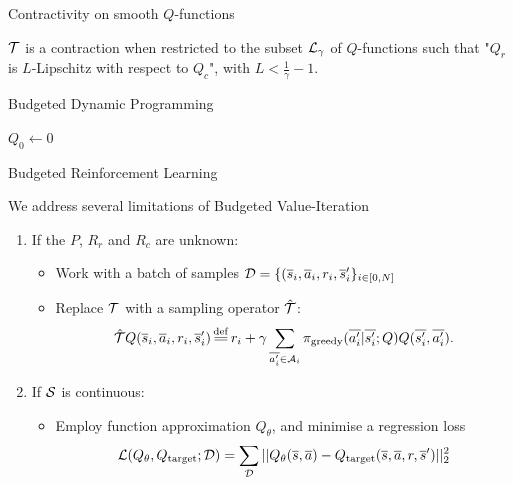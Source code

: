 \documentclass{beamer}
\begin{document}
    \begin{frame}{Contractivity on smooth $Q$-functions}
        \begin{Theorem}
            $\mathcal{T}$ is a contraction when restricted to the subset $\mathcal{L}_\gamma$ of $Q$-functions such that "$Q_r$ is $L$-Lipschitz with respect to $Q_c$", with $L<\frac{1}{\gamma}-1$.
        \end{Theorem}

    \end{frame}

    \begin{frame}{Budgeted Dynamic Programming}
        \begin{algorithm}[H]
            \DontPrintSemicolon
            $Q_{0} \leftarrow 0$\;
            \caption{Budgeted Value-Iteration}
        \end{algorithm}
    \end{frame}


    \begin{frame}{Budgeted Reinforcement Learning}

        We address several limitations of Budgeted Value-Iteration

        \begin{enumerate}
            \pause\item If the $P$, $R_r$ and $R_c$ are unknown:
            \begin{itemize}
                \pause\item Work with a {batch} of samples $\mathcal{D}=\{(\overline{s}_i,\overline{a}_i,r_i,\overline{s}_i'\}_{i\in [0,N]}$
                \pause\item Replace $\mathcal{T}$ with a sampling operator $\hat{\mathcal{T}}$:
                \begin{equation*}
                    \hat{\cT} Q(\os_i, \oa_i, r_i, \os'_i) \eqdef r_i + \gamma \sum_{\ov{a'_i}\in \cA_i} \pi_\text{greedy}(\ov{a'_i}|\ov{s'_i}; Q) Q(\ov{s'_i}, \ov{a'_i}).
                \end{equation*}
            \end{itemize}
            \pause\item If $\mathcal{S}$ is continuous:
            \begin{itemize}
                \pause\item Employ function approximation $Q_\theta$, and minimise a regression loss
                $$\mathcal{L}(Q_\theta, Q_\text{target};\mathcal{D}) = \sum_{\mathcal{D}} ||Q_\theta(\overline{s}, \overline{a}) - Q_\text{target}(\overline{s}, \overline{a}, r, \overline{s}')||_2^2$$
            \end{itemize}

        \end{enumerate}

    \end{frame}
\end{document}
